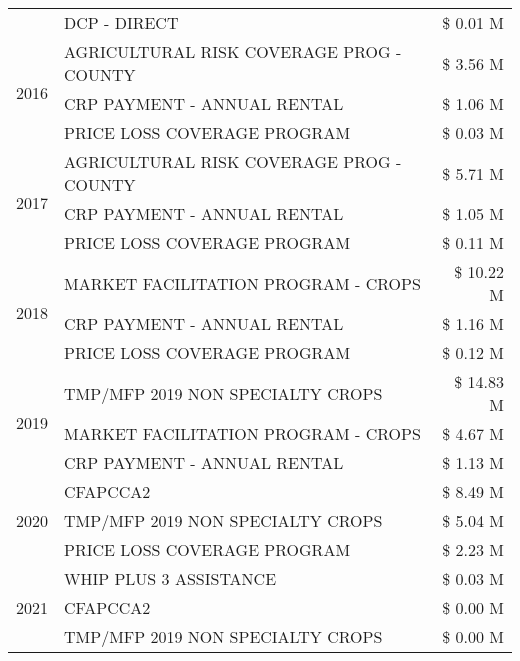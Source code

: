 \begin{tabular}{llr}
 & DCP - DIRECT & \$ 0.01 M \\
\cline{1-3}
\multirow[t]{3}{*}{2016} & AGRICULTURAL RISK COVERAGE PROG - COUNTY      & \$ 3.56 M \\
 & CRP PAYMENT - ANNUAL RENTAL                   & \$ 1.06 M \\
 & PRICE LOSS COVERAGE PROGRAM                   & \$ 0.03 M \\
\cline{1-3}
\multirow[t]{3}{*}{2017} & AGRICULTURAL RISK COVERAGE PROG - COUNTY & \$ 5.71 M \\
 & CRP PAYMENT - ANNUAL RENTAL & \$ 1.05 M \\
 & PRICE LOSS COVERAGE PROGRAM & \$ 0.11 M \\
\cline{1-3}
\multirow[t]{3}{*}{2018} & MARKET FACILITATION PROGRAM - CROPS & \$ 10.22 M \\
 & CRP PAYMENT - ANNUAL RENTAL & \$ 1.16 M \\
 & PRICE LOSS COVERAGE PROGRAM & \$ 0.12 M \\
\cline{1-3}
\multirow[t]{3}{*}{2019} & TMP/MFP 2019 NON SPECIALTY CROPS & \$ 14.83 M \\
 & MARKET FACILITATION PROGRAM - CROPS & \$ 4.67 M \\
 & CRP PAYMENT - ANNUAL RENTAL & \$ 1.13 M \\
\cline{1-3}
\multirow[t]{3}{*}{2020} & CFAPCCA2 & \$ 8.49 M \\
 & TMP/MFP 2019 NON SPECIALTY CROPS & \$ 5.04 M \\
 & PRICE LOSS COVERAGE PROGRAM & \$ 2.23 M \\
\cline{1-3}
\multirow[t]{3}{*}{2021} & WHIP PLUS 3 ASSISTANCE & \$ 0.03 M \\
 & CFAPCCA2 & \$ 0.00 M \\
 & TMP/MFP 2019 NON SPECIALTY CROPS & \$ 0.00 M \\
\cline{1-3}
\bottomrule
\end{tabular}
